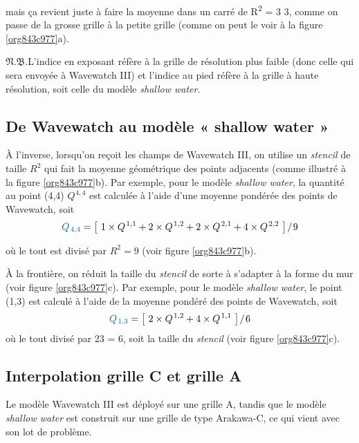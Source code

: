 \documentclass[10pt]{report}
\numberwithin{equation}{section}
\newcommand{\pt}{\hspace{1pt}} %
\newcommand{\nb}{\underline{{\footnotesize\EightStarConvex}\pt $\mathfrak{N.B.}$\vphantom{p}}\hspace{3pt}}
\begin{document}
mais ça revient juste à faire la moyenne dans un carré de R\textsuperscript{2} = 3\texttimes{} 3, comme on passe de la grosse grille à la petite grille (comme on peut le voir à la figure \ref{org843c977}a). \bigskip

\nb L'indice en exposant réfère à la grille de résolution plus faible (donc celle qui sera envoyée à Wavewatch III) et l'indice au pied réfère à la grille à haute résolution, soit celle du modèle \emph{shallow water}.

\subsection{De Wavewatch au modèle « shallow water »}
\label{sec:orga355aff}

À l'inverse, lorsqu'on reçoit les champs de Wavewatch III,  on utilise un \emph{stencil} de taille \(R^2\) qui fait la moyenne géométrique des points adjacents (comme illustré à la figure \ref{org843c977}b).
Par exemple, pour le modèle \emph{shallow water}, la quantité au point (4,4) \(Q^{\pt4,4}\) est calculée à l'aide d'une moyenne pondérée des points de Wavewatch, soit
\begin{equation}
   {\color{MidnightBlue} Q_{\pt4,4}} = \qty[\ 1\times Q^{\pt1,1}+ 2\times Q^{\pt1,2}+ 2\times Q^{\pt2,1}+ 4\times Q^{\pt2,2}\ ]\pt/\pt9
\end{equation}

où le tout est divisé par \(R^2 = 9\) (voir figure \ref{org843c977}b).\bigskip

À la frontière, on réduit la taille du \emph{stencil} de sorte à s'adapter à la forme du mur (voir figure \ref{org843c977}c).
Par exemple, pour le modèle \emph{shallow water}, le point (1,3) est calculé à l'aide de la moyenne pondéré des points de Wavewatch, soit
\begin{equation}
\label{eq:org54c9e40}
   {\color{MidnightBlue} Q_{\pt1,3}} = \qty[\ 2\times Q^{\pt1,2} + 4\times Q^{\pt1,1}\ ]\pt/\pt6
\end{equation}
où le tout divisé par 2\texttimes{}3 = 6, soit la taille du \emph{stencil} (voir figure \ref{org843c977}c).

\subsection{Interpolation grille C et grille A}
\label{sec:org2902117}

Le modèle Wavewatch III est déployé sur une grille A, tandis que le modèle \emph{shallow water} est construit sur une grille de type Arakawa-C, ce qui vient avec son lot de problème.\bigskip
\end{document}
